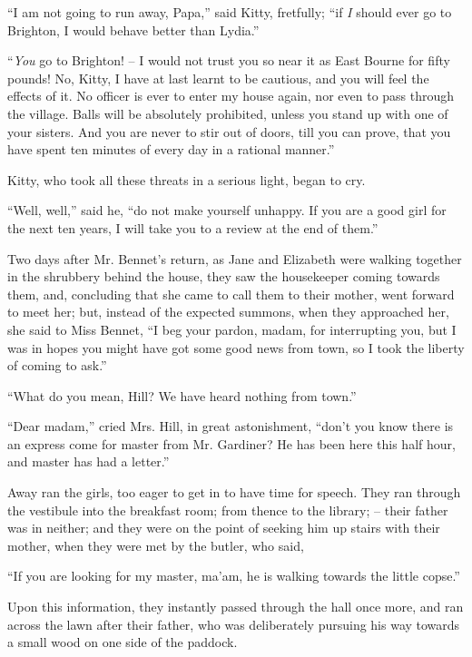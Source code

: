 “I am not going to run away, Papa,” said Kitty,
fretfully; “if \textit{I} should ever go to Brighton, I would
behave better than Lydia.”

“\textit{You} go to Brighton! -- I would not trust you so near
it as East Bourne for fifty pounds! No, Kitty, I have
at last learnt to be cautious, and you will feel the effects
of it. No officer is ever to enter my house again, nor even
to pass through the village. Balls will be absolutely
prohibited, unless you stand up with one of your sisters.
And you are never to stir out of doors, till you can prove,
that you have spent ten minutes of every day in a rational
manner.”

Kitty, who took all these threats in a serious light,
began to cry.

“Well, well,” said he, “do not make yourself unhappy.
If you are a good girl for the next ten years, I will take
you to a review at the end of them.”


Two days after Mr. Bennet’s return, as Jane and
Elizabeth were walking together in the shrubbery behind
the house, they saw the housekeeper coming towards
them, and, concluding that she came to call them to their
mother, went forward to meet her; but, instead of the
expected summons, when they approached her, she said
to Miss Bennet, “I beg your pardon, madam, for interrupting
you, but I was in hopes you might have got some
good news from town, so I took the liberty of coming
to ask.”

“What do you mean, Hill? We have heard nothing
from town.”

“Dear madam,” cried Mrs. Hill, in great astonishment,
“don’t you know there is an express come for master
from Mr. Gardiner? He has been here this half hour, and
master has had a letter.”

Away ran the girls, too eager to get in to have time for
speech. They ran through the vestibule into the breakfast
room; from thence to the library; -- their father was in
neither; and they were on the point of seeking him up
stairs with their mother, when they were met by the butler,
who said,

“If you are looking for my master, ma’am, he is walking
towards the little copse.”

Upon this information, they instantly passed through
the hall once more, and ran across the lawn after their
father, who was deliberately pursuing his way towards
a small wood on one side of the paddock.

